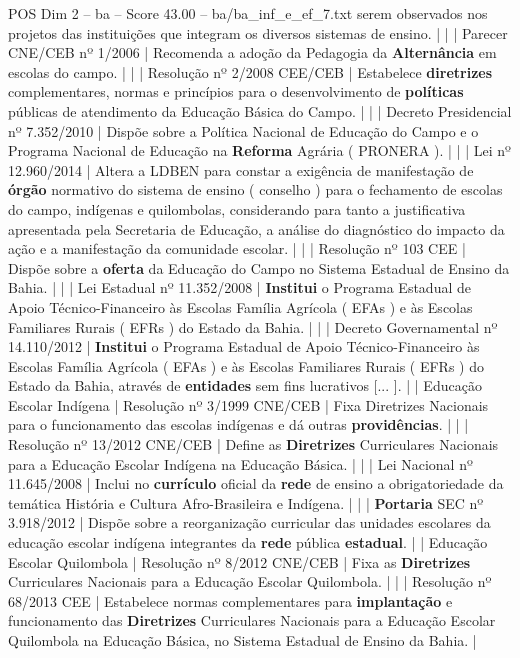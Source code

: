 \begin{textsample}{POS Dim 2 – ba – Score 43.00 – ba/ba\_inf\_e\_ef\_7.txt}
serem observados nos projetos das instituições que integram os diversos sistemas de ensino. | | | Parecer CNE/CEB nº 1/2006 | Recomenda a adoção da Pedagogia da \textbf{Alternância} em escolas do campo. | | | Resolução nº 2/2008 CEE/CEB | Estabelece \textbf{diretrizes} complementares, normas e princípios para o desenvolvimento de \textbf{políticas} públicas de atendimento da Educação Básica do Campo. | | | Decreto Presidencial nº 7.352/2010 | Dispõe sobre a Política Nacional de Educação do Campo e o Programa Nacional de Educação na \textbf{Reforma} Agrária ( PRONERA ). | | | Lei nº 12.960/2014 | Altera a LDBEN para constar a exigência de manifestação de \textbf{órgão} normativo do sistema de ensino ( conselho ) para o fechamento de escolas do campo, indígenas e quilombolas, considerando para tanto a justificativa apresentada pela Secretaria de Educação, a análise do diagnóstico do impacto da ação e a manifestação da comunidade escolar. | | | Resolução nº 103 CEE | Dispõe sobre a \textbf{oferta} da Educação do Campo no Sistema Estadual de Ensino da Bahia. | | | Lei Estadual nº 11.352/2008 | \textbf{Institui} o Programa Estadual de Apoio Técnico-Financeiro às Escolas Família Agrícola ( EFAs ) e às Escolas Familiares Rurais ( EFRs ) do Estado da Bahia. | | | Decreto Governamental nº 14.110/2012 | \textbf{Institui} o Programa Estadual de Apoio Técnico-Financeiro às Escolas Família Agrícola ( EFAs ) e às Escolas Familiares Rurais ( EFRs ) do Estado da Bahia, através de \textbf{entidades} sem fins lucrativos [... ]. | | Educação Escolar Indígena | Resolução nº 3/1999 CNE/CEB | Fixa Diretrizes Nacionais para o funcionamento das escolas indígenas e dá outras \textbf{providências}. | | | Resolução nº 13/2012 CNE/CEB | Define as \textbf{Diretrizes} Curriculares Nacionais para a Educação Escolar Indígena na Educação Básica. | | | Lei Nacional nº 11.645/2008 | Inclui no \textbf{currículo} oficial da \textbf{rede} de ensino a obrigatoriedade da temática História e Cultura Afro-Brasileira e Indígena. | | | \textbf{Portaria} SEC nº 3.918/2012 | Dispõe sobre a reorganização curricular das unidades escolares da educação escolar indígena integrantes da \textbf{rede} pública \textbf{estadual}. | | Educação Escolar Quilombola | Resolução nº 8/2012 CNE/CEB | Fixa as \textbf{Diretrizes} Curriculares Nacionais para a Educação Escolar Quilombola. | | | Resolução nº 68/2013 CEE | Estabelece normas complementares para \textbf{implantação} e funcionamento das \textbf{Diretrizes} Curriculares Nacionais para a Educação Escolar Quilombola na Educação Básica, no Sistema Estadual de Ensino da Bahia. |

\end{textsample}
